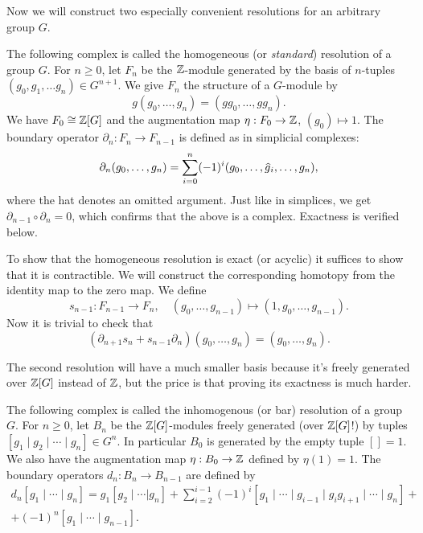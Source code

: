 Now we will construct two especially convenient resolutions for an arbitrary group $G$. 

\begin{defn}
    The following complex is called the homogeneous (or \emph{standard}) resolution of a group $G$. For $n\geq 0$, let $F_n$ be the $\mathbb{Z}$-module generated by the basis of $n$-tuples $(g_0,g_1,\ldots g_n)\in G^{n+1}$. We give $F_n$ the structure of a $G$-module by
    \[g(g_0,\ldots,g_n)=(gg_0,\ldots,gg_n).\]
    We have $F_0\cong \mathbb{Z}[G]$ and the augmentation map $\eta:F_0\to \mathbb{Z}$, $(g_0)\mapsto 1$. The boundary operator $\partial_n:F_n\to F_{n-1}$ is defined as in simplicial complexes:
    \[\partial_n(g_0,\ldots,g_n)=\sum_{i=0}^n(-1)^i(g_0,\ldots,\wh{g}_i,\ldots,g_n),\]
    where the hat denotes an omitted argument. Just like in simplices, we get $\partial_{n-1}\circ \partial_n=0$, which confirms that the above is a complex. Exactness is verified below.
\end{defn}

To show that the homogeneous resolution is exact (or acyclic) it suffices to show that it is contractible. We will construct the corresponding homotopy from the identity map to the zero map. We define
\[s_{n-1}:F_{n-1}\to F_n,\quad (g_0,\ldots,g_{n-1})\mapsto (1,g_0,\ldots,g_{n-1}).\]
Now it is trivial to check that
\[(\partial_{n+1}s_n+s_{n-1}\partial_n)(g_0,\ldots,g_n)=(g_0,\ldots,g_n).\]


The second resolution will have a much smaller basis because it's freely generated over $\mathbb{Z}[G]$ instead of $\mathbb{Z}$, but the price is that proving its exactness is much harder.
\begin{defn}
    The following complex is called the inhomogenous (or bar) resolution of a group $G$. For $n\geq 0$, let $B_n$ be the $\mathbb{Z}[G]$-modules freely generated (over $\mathbb{Z}[G]$!) by tuples $[g_1\mid g_2\mid\cdots \mid g_n]\in G^n$. In particular $B_0$ is generated by the empty tuple $[]=1$. We also have the augmentation map $\eta:B_0\to\mathbb{Z}$ defined by $\eta(1)=1$. The boundary operators $d_n:B_n\to B_{n-1}$ are defined by
    \begin{multline}
        d_n[g_1\mid\cdots\mid g_n]=g_1[g_2\mid\cdots|g_n]+\sum_{i=2}^{i-1}(-1)^i[g_1\mid\cdots\mid g_{i-1}\mid g_ig_{i+1}\mid\cdots\mid g_n]+\\+(-1)^n[g_1\mid\cdots\mid g_{n-1}].
    \end{multline}
\end{defn}


